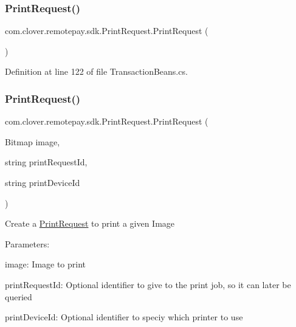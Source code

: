 \subsubsection{\texorpdfstring{Print\+Request()}{PrintRequest()}\hspace{0.1cm}{\footnotesize\ttfamily [1/4]}}
{\footnotesize\ttfamily com.\+clover.\+remotepay.\+sdk.\+Print\+Request.\+Print\+Request (\begin{DoxyParamCaption}{ }\end{DoxyParamCaption})}



Definition at line 122 of file Transaction\+Beans.\+cs.

\mbox{\label{classcom_1_1clover_1_1remotepay_1_1sdk_1_1_print_request_a394189b6f8917be13b8fd5fefe9f96ff}} 
\subsubsection{\texorpdfstring{Print\+Request()}{PrintRequest()}\hspace{0.1cm}{\footnotesize\ttfamily [2/4]}}
{\footnotesize\ttfamily com.\+clover.\+remotepay.\+sdk.\+Print\+Request.\+Print\+Request (\begin{DoxyParamCaption}\item[{Bitmap}]{image,  }\item[{string}]{print\+Request\+Id,  }\item[{string}]{print\+Device\+Id }\end{DoxyParamCaption})}

Create a \hyperlink{classcom_1_1clover_1_1remotepay_1_1sdk_1_1_print_request}{Print\+Request} to print a given Image


\begin{DoxyItemize}
\item Parameters\+:
\begin{DoxyItemize}
\item image\+: Image to print
\item print\+Request\+Id\+: Optional identifier to give to the print job, so it can later be queried
\item print\+Device\+Id\+: Optional identifier to speciy which printer to use 
\end{DoxyItemize}
\end{DoxyItemize}

